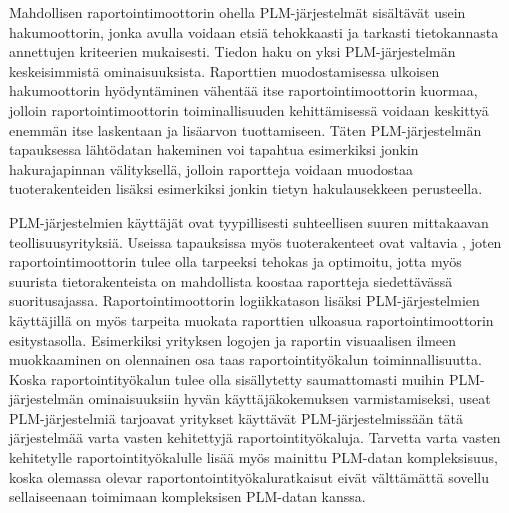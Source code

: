 Mahdollisen raportointimoottorin ohella PLM-järjestelmät sisältävät usein hakumoottorin, jonka avulla voidaan etsiä tehokkaasti ja tarkasti tietokannasta annettujen kriteerien mukaisesti. Tiedon haku on yksi PLM-järjestelmän keskeisimmistä ominaisuuksista. \cite{enriquez_approach_2019} Raporttien muodostamisessa ulkoisen hakumoottorin hyödyntäminen vähentää itse raportointimoottorin kuormaa, jolloin raportointimoottorin toiminallisuuden kehittämisessä voidaan keskittyä enemmän itse laskentaan ja lisäarvon tuottamiseen. Täten PLM-järjestelmän tapauksessa lähtödatan hakeminen voi tapahtua esimerkiksi jonkin hakurajapinnan välityksellä, jolloin raportteja voidaan muodostaa tuoterakenteiden lisäksi esimerkiksi jonkin tietyn hakulausekkeen perusteella.

PLM-järjestelmien käyttäjät ovat tyypillisesti suhteellisen suuren mittakaavan teollisuusyrityksiä. Useissa tapauksissa myös tuoterakenteet ovat valtavia \cite{rohleder_requirements_2014}, joten raportointimoottorin tulee olla tarpeeksi tehokas ja optimoitu, jotta myös suurista tietorakenteista on mahdollista koostaa raportteja siedettävässä suoritusajassa. Raportointimoottorin logiikkatason lisäksi PLM-järjestelmien käyttäjillä on myös tarpeita muokata raporttien ulkoasua raportointimoottorin esitystasolla. Esimerkiksi yrityksen logojen ja raportin visuaalisen ilmeen muokkaaminen on olennainen osa taas raportointityökalun toiminnallisuutta. Koska raportointityökalun tulee olla sisällytetty saumattomasti muihin PLM-järjestelmän ominaisuuksiin hyvän käyttäjäkokemuksen varmistamiseksi, useat PLM-järjestelmiä tarjoavat yritykset käyttävät PLM-järjestelmissään tätä järjestelmää varta vasten kehitettyjä raportointityökaluja. Tarvetta varta vasten kehitetylle raportointityökalulle lisää myös mainittu PLM-datan kompleksisuus, koska olemassa olevar raportontointityökaluratkaisut eivät välttämättä sovellu sellaiseenaan toimimaan kompleksisen PLM-datan kanssa.
